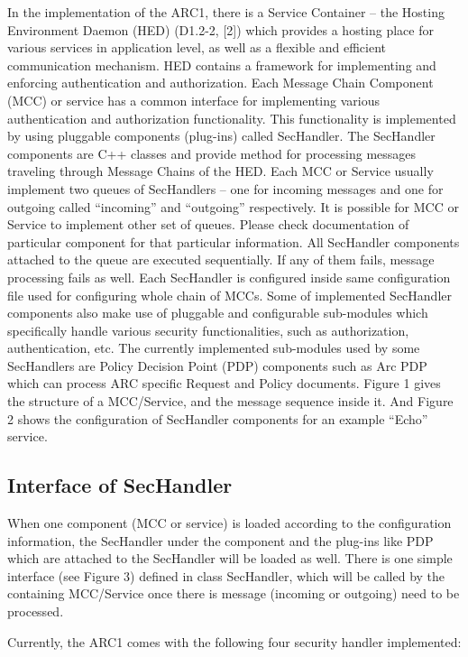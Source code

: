 \documentclass{book}
\begin{document}
In the implementation of the ARC1, there is a Service Container – the Hosting Environment Daemon (HED) (D1.2-2, [2]) which provides a hosting place for various services in application level, as well as a flexible and efficient communication mechanism.
HED contains a framework for implementing and enforcing authentication and authorization. Each Message Chain Component (MCC) or service has a common interface for implementing various authentication and authorization functionality. This functionality is implemented by using pluggable components (plug-ins) called SecHandler. The SecHandler components are C++ classes and provide method for processing messages traveling through Message Chains of the HED. Each MCC or Service  usually implement two queues of SecHandlers – one for incoming messages and one for outgoing called ``incoming'' and ``outgoing'' respectively. It is possible for MCC or Service to implement other set of queues. Please check documentation of particular component for that particular information. All SecHandler components attached to the queue are executed sequentially. If any of them fails, message processing fails as well.
Each SecHandler is configured inside same configuration file used for configuring whole chain of MCCs. Some of implemented SecHandler components also make use of pluggable and configurable sub-modules which specifically handle various security functionalities, such as authorization, authentication, etc. The currently implemented sub-modules used by some SecHandlers are Policy Decision Point (PDP) components such as Arc PDP which can process ARC specific Request and Policy documents. Figure 1 gives the structure of a MCC/Service, and the message sequence inside it. And Figure 2 shows the configuration of SecHandler components for an example ``Echo'' service.


\subsection{Interface of SecHandler} %
\label{subsec:interface_sechandler}

When one component (MCC or service) is loaded according to the configuration information, the SecHandler under the component and the plug-ins like PDP which are attached to the SecHandler will be loaded as well. 
There is one simple interface (see Figure 3) defined in class SecHandler, which will be called by the containing MCC/Service once there is message (incoming or outgoing) need to be processed.

Currently, the ARC1 comes with the following four security handler implemented:
\end{document}
